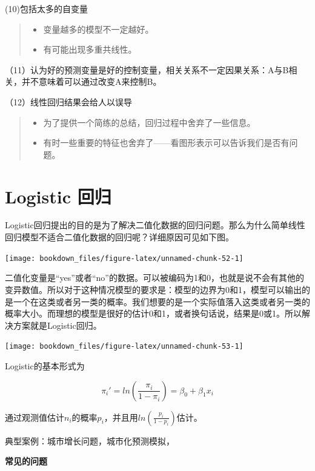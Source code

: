 \documentclass[]{ctexbook}
\providecommand{\tightlist}{%
  \setlength{\itemsep}{0pt}\setlength{\parskip}{0pt}}
\begin{document}
(10)包括太多的自变量

\begin{quote}
\begin{itemize}
\tightlist
\item
  变量越多的模型不一定越好。
\item
  有可能出现多重共线性。
\end{itemize}
\end{quote}

（11）认为好的预测变量是好的控制变量，相关关系不一定因果关系：A与B相关，并不意味着可以通过改变A来控制B。

（12）线性回归结果会给人以误导

\begin{quote}
\begin{itemize}
\tightlist
\item
  为了提供一个简练的总结，回归过程中舍弃了一些信息。
\item
  有时一些重要的特征也舍弃了------看图形表示可以告诉我们是否有问题。
\end{itemize}
\end{quote}

\hypertarget{logistic-ux56deux5f52}{%
\section{Logistic 回归}\label{logistic-ux56deux5f52}}

Logistic回归提出的目的是为了解决二值化数据的回归问题。那么为什么简单线性回归模型不适合二值化数据的回归呢？详细原因可见如下图。

\texttt{[image: bookdown\_files/figure-latex/unnamed-chunk-52-1]}

二值化变量是``yes''或者``no''的数据。可以被编码为1和0，也就是说不会有其他的变异数值。所以对于这种情况模型的要求是：模型的边界为0和1，模型可以输出的是一个在这类或者另一类的概率。我们想要的是一个实际值落入这类或者另一类的概率大小。而理想的模型是很好的估计0和1，或者换句话说，结果是0或1。所以解决方案就是Logistic回归。

\texttt{[image: bookdown\_files/figure-latex/unnamed-chunk-53-1]}

Logistic的基本形式为

\[\pi_i'=ln(\frac{\pi_i}{1-\pi_i})=\beta_0+\beta_1x_i\]

通过观测值估计\(n_i\)的概率\(p_i\)，并且用\(ln(\frac{p_i}{1-p_i})\)估计。

典型案例：城市增长问题，城市化预测模拟，

\textbf{常见的问题}
\end{document}
